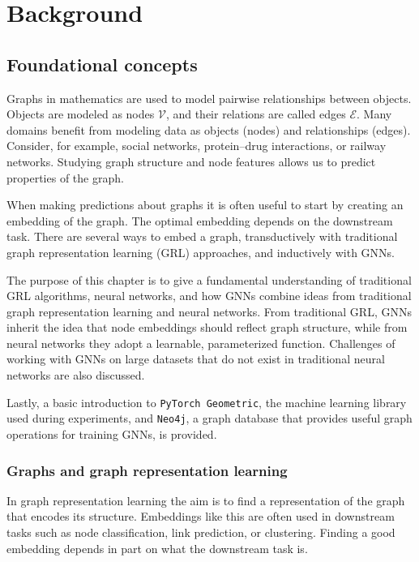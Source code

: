 \documentclass[PhD]{uclathes}
\begin{document}
\chapter{Background}

\section{Foundational concepts}
Graphs in mathematics are used to model pairwise relationships between objects.
Objects are modeled as nodes $\mathcal{V}$, and their relations are called
edges $\mathcal{E}$. Many domains benefit from modeling data as objects (nodes)
and relationships (edges). Consider, for example, social networks,
protein--drug interactions, or railway networks. Studying graph structure and
node features allows us to predict properties of the graph.

When making predictions about graphs it is often useful to start by creating an
embedding of the graph. The optimal embedding depends on the downstream task.
There are several ways to embed a graph, transductively with traditional graph
representation learning (GRL) approaches, and inductively with GNNs.

The purpose of this chapter is to give a fundamental understanding of
traditional GRL algorithms, neural networks, and how GNNs combine ideas from
traditional graph representation learning and neural networks. From traditional
GRL, GNNs inherit the idea that node embeddings should reflect graph structure,
while from neural networks they adopt a learnable, parameterized function.
Challenges of working with GNNs on large datasets that do not exist in
traditional neural networks are also discussed.

Lastly, a basic introduction to \texttt{PyTorch Geometric}, the machine
learning library used during experiments, and \texttt{Neo4j}, a graph database
that provides useful graph operations for training GNNs, is provided.

\subsection{Graphs and graph representation learning}\label{sec:traditional_grl}
In graph representation learning the aim is to find a representation of the
graph that encodes its structure. Embeddings like this are often used in
downstream tasks such as node classification, link prediction, or clustering.
Finding a good embedding depends in part on what the downstream task is.
\end{document}
